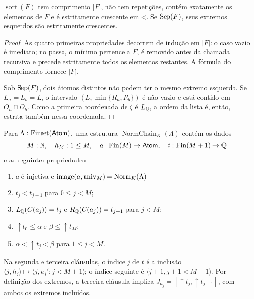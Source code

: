 \begin{lema}\label{map:normalizacao:7.2}\label{normalizacao:lem:sort}
$\operatorname{sort}(F)$ tem comprimento $|F|$, não tem repetições,
contém exatamente os elementos de $F$ e é estritamente crescente
em $\triangleleft$. Se $\operatorname{Sep}(F)$, seus extremos esquerdos são
estritamente crescentes.
\end{lema}
\begin{proof}
As quatro primeiras propriedades decorrem de indução em $|F|$:
o caso vazio é imediato; no passo, o mínimo pertence a $F$, é
removido antes da chamada recursiva e precede estritamente todos
os elementos restantes. A fórmula do comprimento fornece $|F|$.

Sob $\operatorname{Sep}(F)$, dois átomos distintos não podem ter o mesmo
extremo esquerdo. Se $L_a=L_b=L$, o intervalo
$(L,\min\{R_a,R_b\})$ é não vazio e está contido em $O_a\cap O_b$.
Como a primeira coordenada de $\zeta$ é $L_\mathbb Q$, a ordem da lista
é, então, estrita também nessa coordenada.
\end{proof}

\begin{definicao}\label{map:normalizacao:7.3}\label{normalizacao:def:chain}
Para $\Lambda:\operatorname{Finset}(\mathsf{Atom})$, uma estrutura
$\operatorname{NormChain}_K(\Lambda)$ contém os dados
\[
 M:\mathbb N,\quad h_M:1\le M,\quad
 a:\operatorname{Fin}(M)\to\mathsf{Atom},\quad t:\operatorname{Fin}(M+1)\to\mathbb Q
\]
e as seguintes propriedades:
\begin{enumerate}
\item $a$ é injetiva e
$\operatorname{image}(a,\operatorname{univ}_M)=\operatorname{Norm}_K(\Lambda)$;
\item $t_j<t_{j+1}$ para $0\le j<M$;
\item $L_\mathbb Q(C(a_j))=t_j$ e $R_\mathbb Q(C(a_j))=t_{j+1}$ para $j<M$;
\item $\uparrow t_0\le\alpha$ e $\beta\le\uparrow t_M$;
\item $\alpha<\uparrow t_j<\beta$ para $1\le j<M$.
\end{enumerate}
Na segunda e terceira cláusulas, o índice $j$ de $t$ é a inclusão
$\langle j,h_j\rangle\mapsto\langle j,h_j':j<M+1\rangle$;
o índice seguinte é $\langle j+1,j+1<M+1\rangle$.
Por definição dos extremos, a terceira cláusula implica
$J_{a_j}=[\uparrow t_j,\uparrow t_{j+1}]$, com ambos os extremos incluídos.
\end{definicao}

